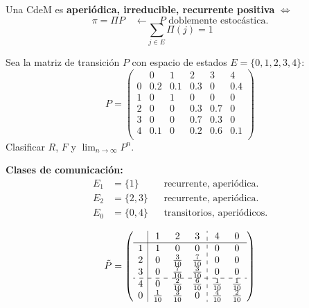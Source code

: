 
Una CdeM es \textbf{aperiódica, irreducible, recurrente positiva} $\Leftrightarrow$
\[
    \pi = \Pi P \quad \leftarrow \quad P \text{ doblemente estocástica.}
\]
\[
    \sum_{j \in E} \Pi(j) = 1
\]


\begin{example}{}{}\label{ex:ejemplo-cdm}
    Sea la matriz de transición $P$ con espacio de estados $E = \{0, 1, 2, 3, 4\}$:
    \[
    P =
    \left(
    \begin{array}{c|ccccc}
        & 0 & 1 & 2 & 3 & 4 \\\hline
      0 & 0.2 & 0.1 & 0.3 & 0   & 0.4 \\
      1 & 0   & 1   & 0   & 0   & 0   \\
      2 & 0   & 0   & 0.3 & 0.7 & 0   \\
      3 & 0   & 0   & 0.7 & 0.3 & 0   \\
      4 & 0.1 & 0   & 0.2 & 0.6 & 0.1 \\
    \end{array}
    \right)
    \]
    Clasificar $R$, $F$ y $\displaystyle\lim_{n \to \infty} P^{n}$.
\end{example}


\textbf{Clases de comunicación:}
\begin{align*}
    E_1 &= \{1\}    & &\text{recurrente, aperiódica.} \\
    E_2 &= \{2, 3\} & &\text{recurrente, aperiódica.} \\
    E_0 &= \{0, 4\} & &\text{transitorios, aperiódicos.}
\end{align*}


\[
\tilde{P} =
\left(
\begin{array}{c|ccc:cc}
    & 1 & 2 & 3 & 4 & 0 \\\hline
  1 & 1            & 0            & 0            & 0            & 0            \\
  2 & 0            & \tfrac{3}{10} & \tfrac{7}{10} & 0            & 0            \\
  3 & 0            & \tfrac{7}{10} & \tfrac{3}{10} & 0            & 0            \\
  \hdashline
  4 & 0            & \tfrac{2}{10} & \tfrac{6}{10} & \tfrac{1}{10} & \tfrac{1}{10} \\
  0 & \tfrac{1}{10} & \tfrac{3}{10} & 0            & \tfrac{4}{10} & \tfrac{2}{10} \\
\end{array}
\right)
\]


